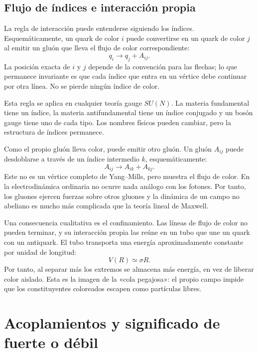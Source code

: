 \subsection{Flujo de índices e interacción propia}

La regla de interacción puede entenderse siguiendo los índices. Esquemáticamente, un quark de color \(i\) puede convertirse en un quark de color \(j\) al emitir un gluón que lleva el flujo de color correspondiente:
\begin{equation}
q_i\longrightarrow q_j+A_{ij}.
\label{eq:l5-quark-gluon-vertex}
\end{equation}
La posición exacta de \(i\) y \(j\) depende de la convención para las flechas; lo que permanece invariante es que cada índice que entra en un vértice debe continuar por otra línea. No se pierde ningún índice de color.

Esta regla se aplica en cualquier teoría gauge \(SU(N)\). La materia fundamental tiene un índice, la materia antifundamental tiene un índice conjugado y un bosón gauge tiene uno de cada tipo. Los nombres físicos pueden cambiar, pero la estructura de índices permanece.

Como el propio gluón lleva color, puede emitir otro gluón. Un gluón \(A_{ij}\) puede desdoblarse a través de un índice intermedio \(k\), esquemáticamente:
\begin{equation}
A_{ij}\longrightarrow A_{ik}+A_{kj}.
\label{eq:l5-three-gluon-index}
\end{equation}
Este no es un vértice completo de Yang--Mills, pero muestra el flujo de color. En la electrodinámica ordinaria no ocurre nada análogo con los fotones. Por tanto, los gluones ejercen fuerzas sobre otros gluones y la dinámica de un campo no abeliano es mucho más complicada que la teoría lineal de Maxwell.

Una consecuencia cualitativa es el confinamiento. Las líneas de flujo de color no pueden terminar, y su interacción propia las reúne en un tubo que une un quark con un antiquark. El tubo transporta una energía aproximadamente constante por unidad de longitud:
\begin{equation}
V(R)\simeq \sigma R.
\end{equation}
Por tanto, al separar más los extremos se almacena más energía, en vez de liberar color aislado. Esta es la imagen de la «cola pegajosa»: el propio campo impide que los constituyentes coloreados escapen como partículas libres.

\section{Acoplamientos y significado de fuerte o débil}


